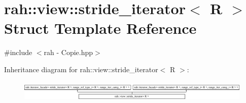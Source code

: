 \hypertarget{structrah_1_1view_1_1stride__iterator}{}\section{rah\+::view\+::stride\+\_\+iterator$<$ R $>$ Struct Template Reference}
\label{structrah_1_1view_1_1stride__iterator}


{\ttfamily \#include $<$rah -\/ Copie.\+hpp$>$}

Inheritance diagram for rah\+::view\+::stride\+\_\+iterator$<$ R $>$\+:\begin{figure}[H]
\begin{center}
\leavevmode
\includegraphics[height=1.018182cm]{structrah_1_1view_1_1stride__iterator}
\end{center}
\end{figure}
